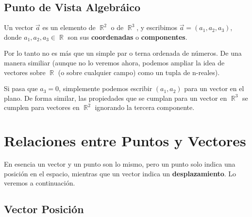\documentclass[12pt, fleqn]{report}                             %
\theoremstyle{break}                                            %
\DeclareMathOperator \Reals        {\mathbb{R}}                 %
\begin{document}
            \subsection{Punto de Vista Algebráico}
            
                Un vector $\vec{a}$ es un elemento de $\Reals^2$ o de $\Reals^3$, y escribimos
                $\vec{a} = (a_1, a_2, a_3)$, donde $a_1, a_2, a_3 \in \Reals$ son sus
                \textbf{coordenadas} o \textbf{componentes}.

                Por lo tanto no es más que un simple par o terna ordenada de números. 
                De una manera similiar (aunque no lo veremos ahora, podemos ampliar la idea de vectores
                sobre $\Reals$ (o sobre cualquier campo) como un tupla de n-reales).

                Si pasa que $a_3 = 0$, simplemente podemos escribir $(a_1, a_2)$ para un vector en el plano.
                De forma similar, las propiedades que se cumplan para un vector en $\Reals^3$ se
                cumplen para vectores en $\Reals^2$ ignorando la tercera componente.

            
        \clearpage
        \section{Relaciones entre Puntos y Vectores}
        
            En esencia un vector y un punto son lo mismo, pero un punto solo indica una posición
            en el espacio, mientras que un vector indica un \textbf{desplazamiento}.
            Lo veremos a continuación.
            
            \subsection{Vector Posición}
            
\end{document}
